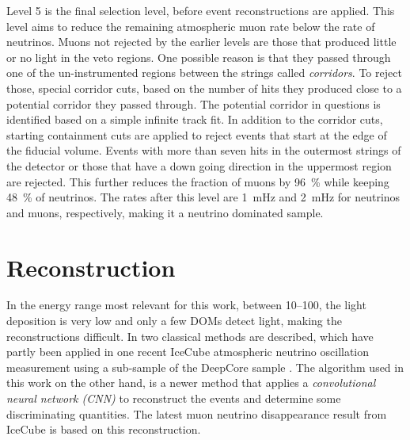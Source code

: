Level 5 is the final selection level, before event reconstructions are applied. This level aims to reduce the remaining atmospheric muon rate below the rate of neutrinos. Muons not rejected by the earlier levels are those that produced little or no light in the veto regions. One possible reason is that they passed through one of the un-instrumented regions between the strings  called \textit{corridors}. To reject those, special corridor cuts, based on the number of hits they produced close to a potential corridor they passed through. The potential corridor in questions is identified based on a simple infinite track fit. In addition to the corridor cuts, starting containment cuts are applied to reject events that start at the edge of the fiducial volume. Events with more than seven hits in the outermost strings of the detector or those that have a down going direction in the uppermost region are rejected. This further reduces the fraction of muons by \SI{96}{\percent} while keeping \SI{48}{\percent} of neutrinos. The rates after this level are \SI{1}{\milli\hertz} and \SI{2}{\milli\hertz} for neutrinos and muons, respectively, making it a neutrino dominated sample.



\section{Reconstruction} 

In the energy range most relevant for this work, between \SIrange[range-phrase={~and~}]{10}{100}{\gev}, the light deposition is very low and only a few DOMs detect light, making the reconstructions difficult. In  two classical methods are described, which have partly been applied in one recent IceCube atmospheric neutrino oscillation measurement using a
sub-sample of the DeepCore sample . The algorithm used in this work on the other hand, is a newer method that applies a \textit{convolutional neural network (CNN)} to reconstruct the events and determine some discriminating quantities. The latest muon neutrino disappearance result from IceCube  is based on this reconstruction.


